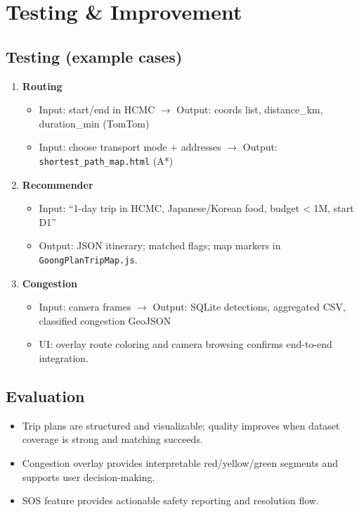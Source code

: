 \chapter{Testing \& Improvement}
\label{chap:testing}

\section{Testing (example cases)}
\begin{enumerate}
  \item \textbf{Routing}
  \begin{itemize}
    \item Input: start/end in HCMC $\rightarrow$ Output: coords list, distance\_km, duration\_min (TomTom)
    \item Input: choose transport mode + addresses $\rightarrow$ Output: \texttt{shortest\_path\_map.html} (A*)
  \end{itemize}

  \item \textbf{Recommender}
  \begin{itemize}
    \item Input: ``1-day trip in HCMC, Japanese/Korean food, budget < 1M, start D1''
    \item Output: JSON itinerary; matched flags; map markers in \texttt{GoongPlanTripMap.js}.
  \end{itemize}

  \item \textbf{Congestion}
  \begin{itemize}
    \item Input: camera frames $\rightarrow$ Output: SQLite detections, aggregated CSV, classified congestion GeoJSON
    \item UI: overlay route coloring and camera browsing confirms end-to-end integration.
  \end{itemize}
\end{enumerate}

\section{Evaluation}
\begin{itemize}
  \item Trip plans are structured and visualizable; quality improves when dataset coverage is strong and matching succeeds.
  \item Congestion overlay provides interpretable red/yellow/green segments and supports user decision-making.
  \item SOS feature provides actionable safety reporting and resolution flow.
\end{itemize}

